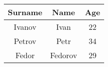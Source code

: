 \documentclass{article}
\begin{document}
\begin{tabular}{|c|c|c|}
\hline
Surname & Name & Age\\ \hline
Ivanov & Ivan & 22\\ \hline
Petrov & Petr & 34\\ \hline
Fedor & Fedorov & 29 \\ \hline
\end{tabular}
\end{document}
